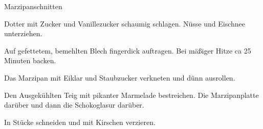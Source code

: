 \begin{recipe}[\vegetarian]{Marzipanschnitten}

    \begin{ingredients}
    \end{ingredients}

    \begin{instructions}
        Dotter mit Zucker und Vanillezucker schaumig schlagen.
        Nüsse und Eischnee unterziehen.
        
        Auf gefettetem, bemehlten Blech fingerdick auftragen.
        Bei mäßiger Hitze ca 25 Minuten backen.

        Das Marzipan mit Eiklar und Staubzucker verkneten und dünn ausrollen.

        Den Ausgekühlten Teig mit pikanter Marmelade bestreichen.
        Die Marzipanplatte darüber und dann die Schokoglasur darüber.

        In Stücke schneiden und mit Kirschen verzieren.
    \end{instructions}
\end{recipe}
